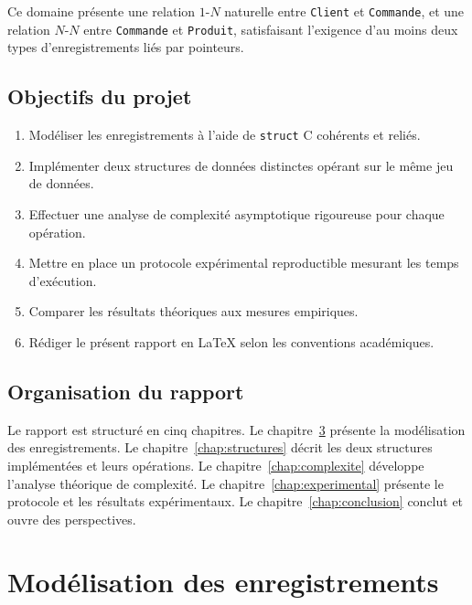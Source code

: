 \documentclass[12pt,a4paper]{report}
\begin{document}
Ce domaine présente une relation $1\text{-}N$ naturelle entre \texttt{Client} et \texttt{Commande}, et une relation $N\text{-}N$ entre \texttt{Commande} et \texttt{Produit}, satisfaisant l'exigence d'au moins deux types d'enregistrements liés par pointeurs.

\section{Objectifs du projet}

\begin{enumerate}
    \item Modéliser les enregistrements à l'aide de \texttt{struct} C cohérents et reliés.
    \item Implémenter deux structures de données distinctes opérant sur le même jeu de données.
    \item Effectuer une analyse de complexité asymptotique rigoureuse pour chaque opération.
    \item Mettre en place un protocole expérimental reproductible mesurant les temps d'exécution.
    \item Comparer les résultats théoriques aux mesures empiriques.
    \item Rédiger le présent rapport en \LaTeX{} selon les conventions académiques.
\end{enumerate}

\section{Organisation du rapport}

Le rapport est structuré en cinq chapitres. Le chapitre~\ref{chap:modelisation} présente la modélisation des enregistrements. Le chapitre~\ref{chap:structures} décrit les deux structures implémentées et leurs opérations. Le chapitre~\ref{chap:complexite} développe l'analyse théorique de complexité. Le chapitre~\ref{chap:experimental} présente le protocole et les résultats expérimentaux. Le chapitre~\ref{chap:conclusion} conclut et ouvre des perspectives.

\chapter{Modélisation des enregistrements}
\label{chap:modelisation}
\end{document}
